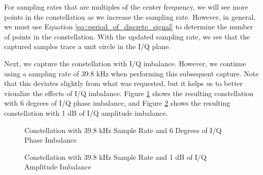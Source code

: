 \documentclass{article}
\begin{document}
For sampling rates that are multiples of the center frequency, we will see more points in the constellation as we increase the sampling rate. However, in general, we must use Equation \ref{eq::period_of_discrete_signal} to determine the number of points in the constellation. With the updated sampling rate, we see that the captured samples trace a unit circle in the I/Q plane.

Next, we capture the constellation with I/Q imbalance. However, we continue using a sampling rate of 39.8 kHz when performing this subsequent capture. Note that this deviates slightly from what was requested, but it helps us to better visualize the effects of I/Q imbalance. Figure \ref{fig::iq_imbalance_0_mag_6_phase_39p8k_samp_rate_const} shows the resulting constellation with 6 degrees of I/Q phase imbalance, and Figure \ref{fig::iq_imbalance_1_mag_0_phase_39p8k_samp_rate_const} shows the resulting constellation with 1 dB of I/Q amplitude imbalance.

\begin{figure}[H]
	\centerline{}
	\caption{Constellation with 39.8 kHz Sample Rate and 6 Degrees of I/Q Phase Imbalance}
	\label{fig::iq_imbalance_0_mag_6_phase_39p8k_samp_rate_const}
\end{figure}

\begin{figure}[H]
	\centerline{}
	\caption{Constellation with 39.8 kHz Sample Rate and 1 dB of I/Q Amplitude Imbalance}
	\label{fig::iq_imbalance_1_mag_0_phase_39p8k_samp_rate_const}
\end{figure}
\end{document}
